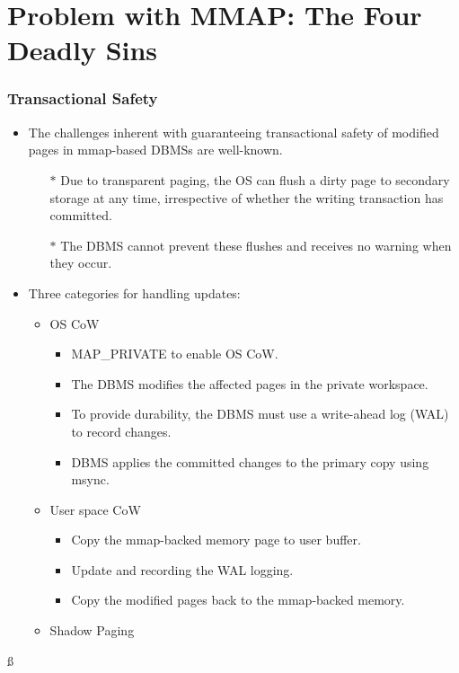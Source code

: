 \documentclass[
	11pt, %
]{beamer}
\begin{document}
\section{Problem with MMAP: The Four Deadly Sins}
\begin{frame}
	\frametitle{Transactional Safety}
	\begin{itemize}
		\item The challenges inherent with guaranteeing transactional safety of modified pages in mmap-based DBMSs are well-known.
		\begin{itemize}
			\item[$\ast$] Due to transparent paging, {\color{red}the OS can flush a dirty page} to secondary storage {\color{red}at any time}, irrespective of whether the writing transaction has committed. 
			\item[$\ast$] The DBMS cannot prevent these flushes and receives {\color{red}no warning} when they occur.
		\end{itemize}
	\end{itemize}
	\begin{itemize}
		\item Three categories for handling updates:
		\begin{itemize}
			\item<1->[$\ast$] OS CoW
			\begin{itemize}
				\item<2->[\checkmark] MAP\_PRIVATE to enable OS CoW.
				\item<3->[\checkmark]The DBMS modifies the affected pages in the private workspace.
				\item<4->[\checkmark] To provide durability, the DBMS must use a write-ahead log (WAL) to record changes.
				\item<5->[\checkmark] DBMS applies the committed changes to the primary copy using msync.
			\end{itemize}
			\item<6->[$\ast$]  User space CoW
			\begin{itemize}
				\item<7->[\checkmark] Copy the mmap-backed memory page to user buffer.
				\item<8->[\checkmark] Update and recording the WAL logging.
				\item<9->[\checkmark] Copy the modified pages back to the mmap-backed memory.
			\end{itemize}
			\item<10->[$\ast$]  Shadow Paging
		\end{itemize}
	\end{itemize}ß
\end{frame}
\end{document}
